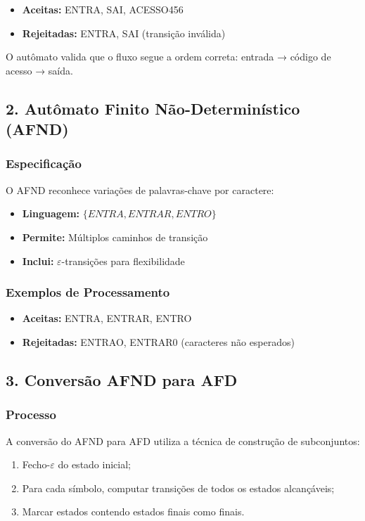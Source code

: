 \documentclass[12pt,a4paper]{article}
\begin{document}
\begin{itemize}
    \item \textbf{Aceitas:} ENTRA, SAI, ACESSO456
    \item \textbf{Rejeitadas:} ENTRA, SAI (transição inválida)
\end{itemize}

O autômato valida que o fluxo segue a ordem correta: entrada → código de acesso → saída.

\subsection{2. Autômato Finito Não-Determinístico (AFND)}

\subsubsection{Especificação}

O AFND reconhece variações de palavras-chave por caractere:
\begin{itemize}
    \item \textbf{Linguagem:} $\{ENTRA, ENTRAR, ENTRO\}$
    \item \textbf{Permite:} Múltiplos caminhos de transição
    \item \textbf{Inclui:} $\varepsilon$-transições para flexibilidade
\end{itemize}

\subsubsection{Exemplos de Processamento}

\begin{itemize}
    \item \textbf{Aceitas:} ENTRA, ENTRAR, ENTRO
    \item \textbf{Rejeitadas:} ENTRAO, ENTRAR0 (caracteres não esperados)
\end{itemize}

\subsection{3. Conversão AFND para AFD}

\subsubsection{Processo}

A conversão do AFND para AFD utiliza a técnica de construção de subconjuntos:
\begin{enumerate}
    \item Fecho-$\varepsilon$ do estado inicial;
    \item Para cada símbolo, computar transições de todos os estados alcançáveis;
    \item Marcar estados contendo estados finais como finais.
\end{enumerate}
\end{document}
